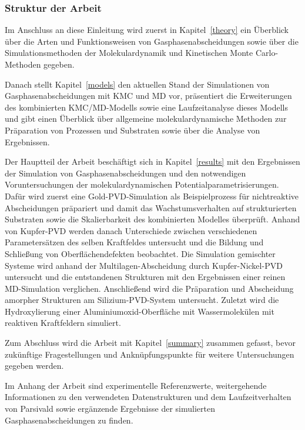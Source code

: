 \subsubsection{Struktur der Arbeit}

Im Anschluss an diese Einleitung wird zuerst in Kapitel~\ref{theory} ein Überblick über die Arten und Funktionsweisen von Gasphasenabscheidungen sowie über die Simulationsmethoden der Molekulardynamik und Kinetischen Monte Carlo-Methoden gegeben.

Danach stellt Kapitel~\ref{models} den aktuellen Stand der Simulationen von Gasphasenabscheidungen mit KMC und MD vor, präsentiert die Erweiterungen des kombinierten KMC/MD-Modells sowie eine Laufzeitanalyse dieses Modells und gibt einen Überblick über allgemeine molekulardynamische Methoden zur Präparation von Prozessen und Substraten sowie über die Analyse von Ergebnissen.

Der Hauptteil der Arbeit beschäftigt sich in Kapitel~\ref{results} mit den Ergebnissen der Simulation von Gasphasenabscheidungen und den notwendigen Voruntersuchungen der molekulardynamischen Potentialparametrisierungen.
Dafür wird zuerst eine Gold-PVD-Simulation als Beispielprozess für nichtreaktive Abscheidungen präpariert und damit das Wachstumsverhalten auf strukturierten Substraten sowie die Skalierbarkeit des kombinierten Modelles überprüft.
Anhand von Kupfer-PVD werden danach Unterschiede zwischen verschiedenen Parametersätzen des selben Kraftfeldes untersucht und die Bildung und Schließung von Oberflächendefekten beobachtet.
Die Simulation gemischter Systeme wird anhand der Multilagen-Abscheidung durch Kupfer-Nickel-PVD untersucht und die entstandenen Strukturen mit den Ergebnissen einer reinen MD-Simulation verglichen.
Anschließend wird die Präparation und Abscheidung amorpher Strukturen am Silizium-PVD-System untersucht.
Zuletzt wird die Hydroxylierung einer Aluminiumoxid-Oberfläche mit Wassermolekülen mit reaktiven Kraftfeldern simuliert.

Zum Abschluss wird die Arbeit mit Kapitel~\ref{summary} zusammen gefasst, bevor zukünftige Fragestellungen und Anknüpfungspunkte für weitere Untersuchungen gegeben werden.

Im Anhang der Arbeit sind experimentelle Referenzwerte, weitergehende Informationen zu den verwendeten Datenstrukturen und dem Laufzeitverhalten von Parsivald sowie ergänzende Ergebnisse der simulierten Gasphasenabscheidungen zu finden.
